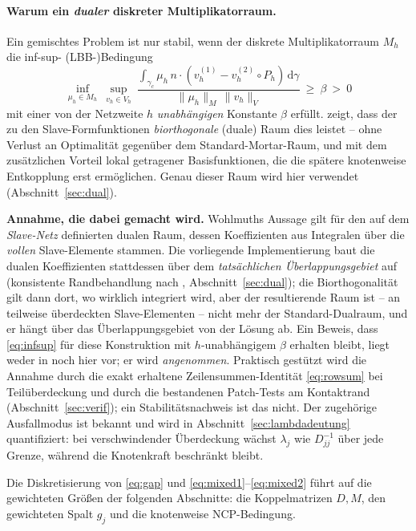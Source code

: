 \documentclass[a4paper,11pt]{article}
\def\bm#1{#1}%
\def\tilde#1{#1}%
\begin{document}
\paragraph{Warum ein \emph{dualer} diskreter Multiplikatorraum.} Ein gemischtes Problem ist nur
stabil, wenn der diskrete Multiplikatorraum $M_h$ die inf-sup- (LBB-)Bedingung
\begin{equation}
\inf_{\mu_h\in M_h}\ \sup_{\bm v_h\in\bm V_h}\
\frac{\int_{\gamma_c}\mu_h\,\bm n\cdot(\bm v_h^{(1)}-\bm v_h^{(2)}\!\circ P_h)\,\mathrm d\gamma}
{\|\mu_h\|_{M}\,\|\bm v_h\|_{\bm V}} \ \ge\ \beta \ >\ 0
\label{eq:infsup}
\end{equation}
mit einer von der Netzweite $h$ \emph{unabhängigen} Konstante $\beta$ erfüllt.
\citet{wohlmuth2000} zeigt, dass der zu den Slave-Formfunktionen \emph{biorthogonale} (duale) Raum
dies leistet -- ohne Verlust an Optimalität gegenüber dem Standard-Mortar-Raum, und mit dem
zusätzlichen Vorteil lokal getragener Basisfunktionen, die die spätere knotenweise Entkopplung
erst ermöglichen. Genau dieser Raum wird hier verwendet (Abschnitt~\ref{sec:dual}).

\medskip
\noindent\textbf{Annahme, die dabei gemacht wird.} Wohlmuths Aussage gilt für den auf dem
\emph{Slave-Netz} definierten dualen Raum, dessen Koeffizienten aus Integralen über die
\emph{vollen} Slave-Elemente stammen. Die vorliegende Implementierung baut die dualen
Koeffizienten stattdessen über dem \emph{tatsächlichen Überlappungsgebiet} auf (konsistente
Randbehandlung nach \citet{cichosz}, Abschnitt~\ref{sec:dual}); die Biorthogonalität gilt dann dort,
wo wirklich integriert wird, aber der resultierende Raum ist -- an teilweise überdeckten
Slave-Elementen -- nicht mehr der Standard-Dualraum, und er hängt über das Überlappungsgebiet
von der Lösung ab. Ein Beweis, dass \eqref{eq:infsup} für diese Konstruktion mit
$h$-unabhängigem $\beta$ erhalten bleibt, liegt weder in \citet{cichosz} noch hier vor; er wird
\emph{angenommen}. Praktisch gestützt wird die Annahme durch die exakt erhaltene
Zeilensummen-Identität \eqref{eq:rowsum} bei Teilüberdeckung und durch die bestandenen
Patch-Tests am Kontaktrand (Abschnitt~\ref{sec:verif}); ein Stabilitätsnachweis ist das nicht.
Der zugehörige Ausfallmodus ist bekannt und wird in Abschnitt~\ref{sec:lambdadeutung}
quantifiziert: bei verschwindender Überdeckung wächst $\lambda_j$ wie $\tilde D_{jj}^{-1}$ über
jede Grenze, während die Knotenkraft beschränkt bleibt.

\medskip
\noindent Die Diskretisierung von \eqref{eq:gap} und \eqref{eq:mixed1}--\eqref{eq:mixed2} führt auf
die gewichteten Größen der folgenden Abschnitte: die Koppelmatrizen $\bm D,\bm M$, den gewichteten
Spalt $\tilde g_j$ und die knotenweise NCP-Bedingung.
\end{document}
